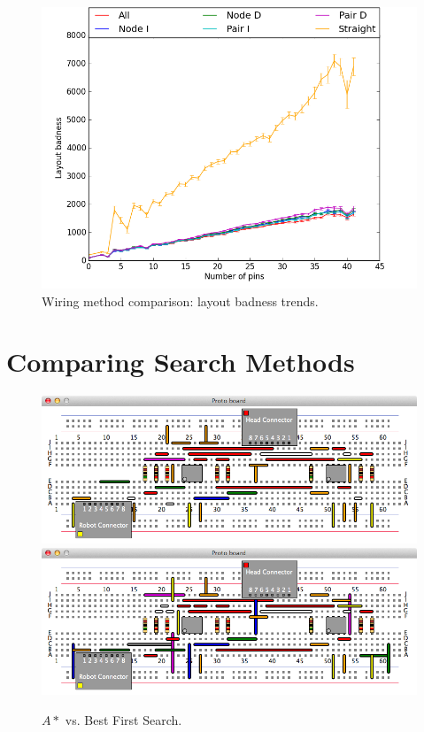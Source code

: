 \begin{figure}[H]
\begin{center}
\includegraphics[width=\textwidth]{Images/wiring_badness_trend_comparison.png}
\caption{Wiring method comparison: layout badness trends.}
\label{fig:wiring_badness_trend}
\end{center}
\end{figure}

\section{Comparing Search Methods}

\begin{figure}[H]
\begin{center}
\includegraphics[width=\textwidth]{Images/exemplar_per_pair_decreasing.png}
\includegraphics[width=\textwidth]{Images/exemplar_best_first.png}
\caption{$A*$ vs. Best First Search.}
\end{center}
\end{figure}

